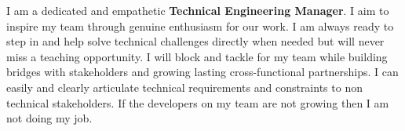 
\begin{cvsummary}
  \summary
    {I am a dedicated and empathetic \textbf{Technical Engineering Manager}. I aim to inspire my team through genuine enthusiasm for our work. I am always ready to step in and help solve technical challenges directly when needed but will never miss a teaching opportunity. I will block and tackle for my team while building bridges with stakeholders and growing lasting cross-functional partnerships. I can easily and clearly articulate technical requirements and constraints to non technical stakeholders. If the developers on my team are not growing then I am not doing my job.
    }
\end{cvsummary}